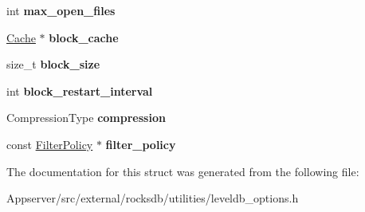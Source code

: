 \begin{DoxyCompactItemize}
\item 
int {\bfseries max\+\_\+open\+\_\+files}\hypertarget{structrocksdb_1_1LevelDBOptions_aef717385b3d0e2868e09c755de31575a}{}\label{structrocksdb_1_1LevelDBOptions_aef717385b3d0e2868e09c755de31575a}

\item 
\hyperlink{classrocksdb_1_1Cache}{Cache} $\ast$ {\bfseries block\+\_\+cache}\hypertarget{structrocksdb_1_1LevelDBOptions_a535719d0da82c8c57724a5f52de9b2d5}{}\label{structrocksdb_1_1LevelDBOptions_a535719d0da82c8c57724a5f52de9b2d5}

\item 
size\+\_\+t {\bfseries block\+\_\+size}\hypertarget{structrocksdb_1_1LevelDBOptions_a086a3829758119178fe32358259cfd6f}{}\label{structrocksdb_1_1LevelDBOptions_a086a3829758119178fe32358259cfd6f}

\item 
int {\bfseries block\+\_\+restart\+\_\+interval}\hypertarget{structrocksdb_1_1LevelDBOptions_a906eb3051388f6e530e0868af22e065d}{}\label{structrocksdb_1_1LevelDBOptions_a906eb3051388f6e530e0868af22e065d}

\item 
Compression\+Type {\bfseries compression}\hypertarget{structrocksdb_1_1LevelDBOptions_adc67c994a2b43000064d7365dddef026}{}\label{structrocksdb_1_1LevelDBOptions_adc67c994a2b43000064d7365dddef026}

\item 
const \hyperlink{classrocksdb_1_1FilterPolicy}{Filter\+Policy} $\ast$ {\bfseries filter\+\_\+policy}\hypertarget{structrocksdb_1_1LevelDBOptions_ab213c2c0f4827ae42d403de95fe8c6b3}{}\label{structrocksdb_1_1LevelDBOptions_ab213c2c0f4827ae42d403de95fe8c6b3}

\end{DoxyCompactItemize}


The documentation for this struct was generated from the following file\+:\begin{DoxyCompactItemize}
\item 
Appserver/src/external/rocksdb/utilities/leveldb\+\_\+options.\+h\end{DoxyCompactItemize}
